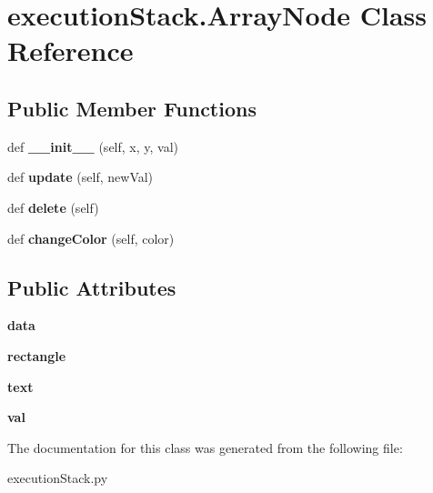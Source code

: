 \hypertarget{classexecution_stack_1_1_array_node}{}\section{execution\+Stack.\+Array\+Node Class Reference}
\label{classexecution_stack_1_1_array_node}
\subsection*{Public Member Functions}
\begin{DoxyCompactItemize}
\item 
\mbox{\label{classexecution_stack_1_1_array_node_a77706dea871f1d386358a73040e5dea3}} 
def {\bfseries \+\_\+\+\_\+init\+\_\+\+\_\+} (self, x, y, val)
\item 
\mbox{\label{classexecution_stack_1_1_array_node_ad2f67bb5aff43e472147fd8b6c437662}} 
def {\bfseries update} (self, new\+Val)
\item 
\mbox{\label{classexecution_stack_1_1_array_node_ac61da4f274e4fdaf71cc76e1c77d21a0}} 
def {\bfseries delete} (self)
\item 
\mbox{\label{classexecution_stack_1_1_array_node_afe1ddcc32a2d47d16b16c39b9a79ecbc}} 
def {\bfseries change\+Color} (self, color)
\end{DoxyCompactItemize}
\subsection*{Public Attributes}
\begin{DoxyCompactItemize}
\item 
\mbox{\label{classexecution_stack_1_1_array_node_afb62811ca045506e06a377713425033b}} 
{\bfseries data}
\item 
\mbox{\label{classexecution_stack_1_1_array_node_a94d21c229777c52da0d5552a7883821d}} 
{\bfseries rectangle}
\item 
\mbox{\label{classexecution_stack_1_1_array_node_ad4730d0b91ec85244f3e3e6bf6faf1a1}} 
{\bfseries text}
\item 
\mbox{\label{classexecution_stack_1_1_array_node_a95f1b1902891cf3fb239bece841e4bb5}} 
{\bfseries val}
\end{DoxyCompactItemize}


The documentation for this class was generated from the following file\+:\begin{DoxyCompactItemize}
\item 
execution\+Stack.\+py\end{DoxyCompactItemize}
